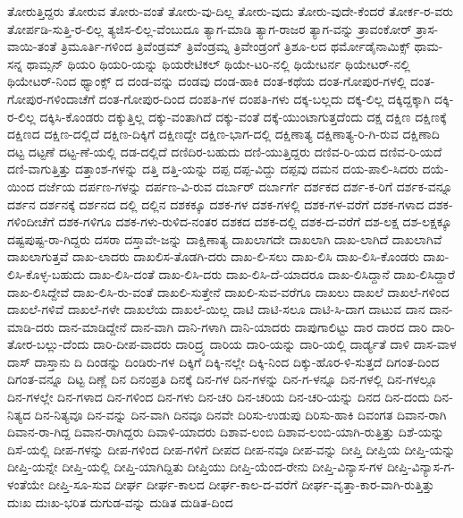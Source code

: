 {ತೋರುತ್ತಿದ್ದರು
ತೋರುವ
ತೋರು-ವಂತೆ
ತೋರು-ವು-ದಿಲ್ಲ
ತೋರು-ವುದು
ತೋರು-ವುದೇ-ಕೆಂದರೆ
ತೋರ್ಕ-ರ-ವರು
ತೋರ್ಪಡಿ-ಸುತ್ತಿ-ರ-ಲಿಲ್ಲ
ತ್ಯಜಿಸ-ಲಿಲ್ಲ-ವೆಂಬುದೂ
ತ್ಯಾಗ-ಮಾಡಿ
ತ್ಯಾಗ-ರಾಜರ
ತ್ಯಾಗ-ವನ್ನು
ತ್ರಾವಂಕೋರ್
ತ್ರಾಸ-ವಾಯಿ-ತಂತೆ
ತ್ರಿಮೂರ್ತಿ-ಗಳಿಂದ
ತ್ರಿವೆಂಡ್ರಮ್
ತ್ರಿವೆಂಡ್ರಮ್ನ
ತ್ರಿವೇಂಡ್ರಂಗೆ
ತ್ರಿಶೂ-ಲದ
ಥರ್ಮೋಡೈನಾಮಿಕ್ಸ್
ಥಾಮ-ಸನ್ನ
ಥಾಮ್ಸನ್
ಥಿಯರಿ
ಥಿಯರಿ-ಯನ್ನು
ಥಿಯರೇಟಿಕಲ್
ಥಿಯೇ-ಟರಿ-ನಲ್ಲಿ
ಥಿಯೇಟರ್ನ
ಥಿಯೇಟರ್-ನಲ್ಲಿ
ಥಿಯೇಟರ್-ನಿಂದ
ಥ್ಯಾಂಕ್ಸ್
ದ
ದಂಡ-ವನ್ನು
ದಂಡವು
ದಂಡ-ಹಾಕಿ
ದಂತ-ಕಥೆಯ
ದಂತ-ಗೋಪುರ-ಗಳಲ್ಲಿ
ದಂತ-ಗೋಪುರ-ಗಳಿಂದಾಚೆಗೆ
ದಂತ-ಗೋಪುರ-ದಿಂದ
ದಂಪತಿ-ಗಳ
ದಂಪತಿ-ಗಳು
ದಕ್ಕ-ಬಲ್ಲದು
ದಕ್ಕ-ಲಿಲ್ಲ
ದಕ್ಕಿದ್ದಕ್ಕಾಗಿ
ದಕ್ಕಿ-ರ-ಲಿಲ್ಲ
ದಕ್ಕಿಸಿ-ಕೊಂಡರು
ದಕ್ಕುತ್ತಿಲ್ಲ
ದಕ್ಕು-ವಂತಾಗಿದೆ
ದಕ್ಕು-ವಂತೆ
ದಕ್ಕೆ-ಯುಂಟಾಗುತ್ತದೆಂದು
ದಕ್ಷ
ದಕ್ಷಿಣ
ದಕ್ಷಿಣಕ್ಕೆ
ದಕ್ಷಿಣದ
ದಕ್ಷಿಣ-ದಲ್ಲಿದೆ
ದಕ್ಷಿಣ-ದಿಕ್ಕಿಗೆ
ದಕ್ಷಿಣದ್ದೇ
ದಕ್ಷಿಣ-ಭಾಗ-ದಲ್ಲಿ
ದಕ್ಷಿಣಾತ್ಯ
ದಕ್ಷಿಣಾತ್ಯ-ರಿ-ಗಿ-ರುವ
ದಕ್ಷಿಣಾದಿ
ದಟ್ಟ
ದಟ್ಟಣೆ
ದಟ್ಟ-ಣೆ-ಯಲ್ಲಿ
ದಡ-ದಲ್ಲಿದೆ
ದಣಿದಿರ-ಬಹುದು
ದಣಿ-ಯುತ್ತಿದ್ದರು
ದಣಿವ-ರಿ-ಯದ
ದಣಿವ-ರಿ-ಯದೆ
ದಣಿ-ವಾಗುತ್ತಿತ್ತು
ದತ್ತಾಂಶ-ಗಳನ್ನು
ದತ್ತಿ
ದತ್ತಿ-ಯನ್ನು
ದಪ್ಪ
ದಪ್ಪ-ವಿದ್ದು
ದಪ್ಪವು
ದಮನ
ದಯ-ಪಾಲಿ-ಸಿದರು
ದಯೆ-ಯಿಂದ
ದರ್ಜೆಯ
ದರ್ಪಣ-ಗಳನ್ನು
ದರ್ಪಣ-ವಿ-ರುವ
ದರ್ಬಾರ್
ದರ್ಬಾರ್ಗೆ
ದರ್ಶಕದ
ದರ್ಶ-ಕ-ರಿಗೆ
ದರ್ಶಕ-ವನ್ನೂ
ದರ್ಶನ
ದರ್ಶನಕ್ಕೆ
ದರ್ಶನದ
ದಲ್ಲಿ
ದಲ್ಲಿನ
ದಶಕಕ್ಕೂ
ದಶಕ-ಗಳ
ದಶಕ-ಗಳಲ್ಲಿ
ದಶಕ-ಗಳ-ವರೆಗೆ
ದಶಕ-ಗಳಾದ
ದಶಕ-ಗಳಿಂದೀಚೆಗೆ
ದಶಕ-ಗಳಿಗೂ
ದಶಕ-ಗಳು-ರುಳಿದ-ನಂತರ
ದಶಕದ
ದಶಕ-ದಲ್ಲಿ
ದಶಕ-ದ-ವರೆಗೆ
ದಶ-ಲಕ್ಷ
ದಶ-ಲಕ್ಷಕ್ಕೂ
ದಷ್ಟಪುಷ್ಟ-ರಾ-ಗಿದ್ದರು
ದಸರಾ
ದಸ್ತಾವೇ-ಜನ್ನು
ದಾಕ್ಷಿಣಾತ್ಯ
ದಾಖಲಾಗದೇ
ದಾಖಲಾಗಿ
ದಾಖ-ಲಾಗಿದೆ
ದಾಖಲಾಗಿವೆ
ದಾಖಲಾಗುತ್ತವೆ
ದಾಖ-ಲಾದರು
ದಾಖಲಿಸ-ತೊಡಗಿ-ದರು
ದಾಖ-ಲಿ-ಸಲು
ದಾಖ-ಲಿಸಿ
ದಾಖ-ಲಿಸಿ-ಕೊಂಡರು
ದಾಖ-ಲಿಸಿ-ಕೊಳ್ಳ-ಬಹುದು
ದಾಖ-ಲಿಸಿ-ದಂತೆ
ದಾಖ-ಲಿಸಿ-ದರು
ದಾಖ-ಲಿಸಿ-ದೆ-ಯಾದರೂ
ದಾಖ-ಲಿಸಿದ್ದಾನೆ
ದಾಖ-ಲಿಸಿದ್ದಾರೆ
ದಾಖ-ಲಿಸಿದ್ದೇವೆ
ದಾಖ-ಲಿಸಿ-ರು-ವಂತೆ
ದಾಖಲಿ-ಸುತ್ತೇನೆ
ದಾಖಲಿ-ಸುವ-ವರೆಗೂ
ದಾಖಲು
ದಾಖಲೆ
ದಾಖಲೆ-ಗಳಿಂದ
ದಾಖಲೆ-ಗಳಿವೆ
ದಾಖಲೆ-ಗಳೇ
ದಾಖಲೆಯ
ದಾಖಲೆ-ಯಿಲ್ಲ
ದಾಟಿ
ದಾಟಿ-ಸಲೂ
ದಾಟಿ-ಸಿ-ದಾಗ
ದಾಟುವ
ದಾನ
ದಾನ-ಮಾಡಿ-ದರು
ದಾನ-ಮಾಡಿದ್ದೇನೆ
ದಾನ-ವಾಗಿ
ದಾನಿ-ಗಳಾಗಿ
ದಾನಿ-ಯಾದರು
ದಾಪುಗಾಲಿಟ್ಟು
ದಾರ
ದಾರದ
ದಾರಿ
ದಾರಿ-ತೋರ-ಬಲ್ಲು-ದೆಂದು
ದಾರಿ-ದೀಪ-ವಾದರು
ದಾರಿದ್ರ್ಯ
ದಾರಿಯ
ದಾರಿ-ಯನ್ನು
ದಾರಿ-ಯಲ್ಲಿ
ದಾರ್ಡ್ಯತೆ
ದಾಳಿ
ದಾಸ-ವಾಳ
ದಾಸ್
ದಾಸ್ತಾನು
ದಿ
ದಿಂಡನ್ನು
ದಿಂಡಿರು-ಗಳ
ದಿಕ್ಕಿಗೆ
ದಿಕ್ಕಿ-ನಲ್ಲೇ
ದಿಕ್ಕಿ-ನಿಂದ
ದಿಕ್ಕು-ಹೊರ-ಳಿ-ಸುತ್ತದೆ
ದಿಗಂತ-ದಿಂದ
ದಿಗಂತ-ವನ್ನೂ
ದಿಟ್ಟ
ದಿಣ್ಣೆ
ದಿನ
ದಿನಂಪ್ರತಿ
ದಿನಕ್ಕೆ
ದಿನ-ಗಳ
ದಿನ-ಗಳನ್ನು
ದಿನ-ಗ-ಳನ್ನೂ
ದಿನ-ಗಳಲ್ಲಿ
ದಿನ-ಗಳಲ್ಲೂ
ದಿನ-ಗಳಲ್ಲೇ
ದಿನ-ಗಳಾದ
ದಿನ-ಗಳಿಂದ
ದಿನ-ಗಳು
ದಿನ-ಚರಿ
ದಿನ-ಚರಿಯ
ದಿನ-ಚರಿ-ಯನ್ನು
ದಿನದ
ದಿನ-ದಂದು
ದಿನ-ನಿತ್ಯದ
ದಿನ-ನಿತ್ಯವೂ
ದಿನ-ವನ್ನು
ದಿನ-ವಾಗಿ
ದಿನವೂ
ದಿನವೇ
ದಿರಿಸು-ಉಡುಪು
ದಿರಿಸು-ಹಾಕಿ
ದಿವಂಗತ
ದಿವಾನ-ರಾಗಿ
ದಿವಾನ-ರಾ-ಗಿದ್ದ
ದಿವಾನ-ರಾಗಿದ್ದರು
ದಿವಾಳಿ-ಯಾದರು
ದಿಶಾವ-ಲಂಬಿ
ದಿಶಾವ-ಲಂಬಿ-ಯಾಗಿ-ರುತ್ತಿತ್ತು
ದಿಶೆ-ಯನ್ನು
ದಿಸೆ-ಯಲ್ಲಿ
ದೀಪ-ಗಳನ್ನು
ದೀಪ-ಗಳಿಂದ
ದೀಪ-ಗಳಿಗೆ
ದೀಪದ
ದೀಪ-ನವೂ
ದೀಪ-ವನ್ನು
ದೀಪ್ತಿ
ದೀಪ್ತಿಯ
ದೀಪ್ತಿ-ಯನ್ನು
ದೀಪ್ತಿ-ಯನ್ನೇ
ದೀಪ್ತಿ-ಯಲ್ಲಿ
ದೀಪ್ತಿ-ಯಾಗಿದ್ದಿತು
ದೀಪ್ತಿಯು
ದೀಪ್ತಿ-ಯೆಂದ-ರೇನು
ದೀಪ್ತಿ-ವಿನ್ಯಾಸ-ಗಳ
ದೀಪ್ತಿ-ವಿನ್ಯಾಸ-ಗ-ಳಂತೆಯೇ
ದೀಪ್ತಿ-ಸೂ-ಸುವ
ದೀರ್ಘ
ದೀರ್ಘ-ಕಾಲದ
ದೀರ್ಘ-ಕಾಲ-ದ-ವರೆಗೆ
ದೀರ್ಘ-ವೃತ್ತಾ-ಕಾರ-ವಾಗಿ-ರುತ್ತಿತ್ತು
ದುಃಖ
ದುಃಖ-ಭರಿತ
ದುಗುಡ-ವನ್ನು
ದುಡಿತ
ದುಡಿತ-ದಿಂದ
}
